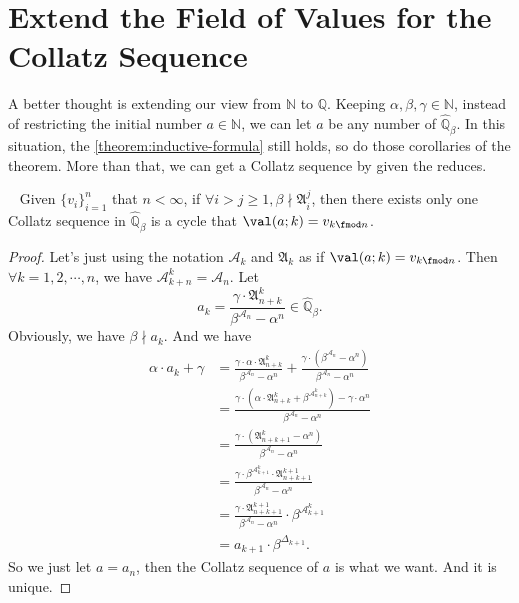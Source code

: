 \section{Extend the Field of Values for the Collatz Sequence}\label{sec:extend-the-field-of-values-for-the-collatz-sequence}

A better thought is extending our view from $\mathbb{N}$ to $\mathbb{Q}$.
Keeping $\alpha, \beta, \gamma \in \mathbb{N}$, instead of restricting the initial number $a \in \mathbb{N}$, we can let $a$ be any number of $\widehat{\mathbb{Q}}_{{\beta}}$.
In this situation, the \cref{theorem:inductive-formula} still holds, so do those corollaries of the theorem.
More than that, we can get a Collatz sequence by given the reduces.

\begin{theorem}~\label{theorem:any-cycle}
    Given $\{v_{i}\}_{i=1}^{n}$ that $n < \infty$, if $\forall i>j\ge1, \beta \nmid \mathfrak{A}_i^{j}$, then there exists only one Collatz sequence in $\widehat{\mathbb{Q}}_{{\beta}}$ is a cycle that $\val(a;k) = v_{k\fmod n}$.
\end{theorem}
\begin{proof}%
    Let's just using the notation $\mathcal{A}_k$ and $\mathfrak{A}_k$ as if $\val(a;k) = v_{k\fmod n}$.\newline
    Then $\forall k = 1, 2, \cdots, n$, we have $\mathcal{A}_{k + n}^{k} = \mathcal{A}_n$.
    Let
    \[ a_k = \frac{\gamma\cdot\mathfrak{A}_{n+k}^{k}}{\beta^{\mathcal{A}_n} - \alpha^n} \in \widehat{\mathbb{Q}}_{{\beta}}. \]
    Obviously, we have $\beta \nmid a_{k}$.
    And we have
    \begin{align*}
        \alpha\cdot a_{k} + \gamma &= \frac{\gamma\cdot\alpha\cdot\mathfrak{A}_{n+k}^{k}}{\beta^{\mathcal{A}_n} - \alpha^n} + \frac{\gamma\cdot(\beta^{\mathcal{A}_n} - \alpha^n)}{\beta^{\mathcal{A}_n} - \alpha^n} \\
        &= \frac{\gamma\cdot(\alpha\cdot\mathfrak{A}_{n+k}^{k}+\beta^{\mathcal{A}_{n+k}^{k}}) - \gamma\cdot\alpha^n}{\beta^{\mathcal{A}_n} - \alpha^n} \\
        &= \frac{\gamma\cdot(\mathfrak{A}_{n+k+1}^{k} - \alpha^{n})}{\beta^{\mathcal{A}_n} - \alpha^n} \\
        &= \frac{\gamma\cdot\beta^{\mathcal{A}_{k+1}^{k}}\cdot\mathfrak{A}_{n+k+1}^{k+1}}{\beta^{\mathcal{A}_n} - \alpha^n} \\
        &= \frac{\gamma\cdot\mathfrak{A}_{n+k+1}^{k+1}}{\beta^{\mathcal{A}_n} - \alpha^n}\cdot \beta^{\mathcal{A}_{k+1}^{k}} \\
        &= a_{k+1}\cdot \beta^{\Delta_{k+1}}.
    \end{align*}
    So we just let $a = a_{n}$, then the Collatz sequence of $a$ is what we want.
    And it is unique.
\end{proof}
